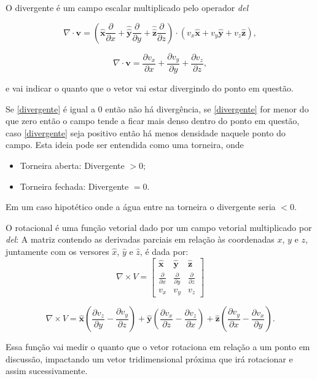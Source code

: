 O divergente é um campo escalar multiplicado pelo operador \textit{del} 

\begin{equation*}
    \nabla \cdot \textbf{v} = (\hat{\textbf{x}} \frac{\partial}{\partial x} + \hat{\hat{\textbf{y}}} \frac{\partial}{\partial y} + \hat{\hat{\textbf{z}}} \frac{\partial}{\partial z}) \cdot (v_{x} {\hat{\textbf{x}}} + v_{y} {\hat{\textbf{y}}} + v_{z} {\hat{\textbf{z}}}) ,
\end{equation*}


\begin{equation} \label{divergente}
    \nabla \cdot \textbf{v} = \frac{\partial v_{x}}{\partial x} + \frac{\partial v_{y}}{\partial y} + \frac{\partial v_{z}}{\partial z} ,
\end{equation}

e vai indicar o quanto que o vetor vai estar divergindo do ponto em questão. 

Se \ref{divergente} é igual a $0$ então não há divergência,  se \ref{divergente} for menor do que zero então o campo tende a ficar mais denso dentro do ponto em questão, caso \ref{divergente} seja positivo então há menos densidade naquele ponto do campo. Esta ideia pode ser entendida como uma torneira, onde

\begin{itemize}
    \item Torneira aberta: Divergente $ > 0$;
    \item Torneira fechada: Divergente $= 0$.
\end{itemize}

Em um caso hipotético onde a água entre na torneira o divergente seria $< 0$. 

O rotacional é uma função vetorial dado por um campo vetorial multiplicado por \textit{del}: 
A matriz contendo as derivadas parciais em relação às coordenadas $x$, $y$ e $z$, juntamente com os versores $\hat{x}$, $\hat{y}$ e $\hat{z}$, é dada por:
\begin{equation*}
\nabla \times  V = 
\begin{bmatrix}
{\hat{\textbf{x}}} & {\hat{\textbf{y}}} & {\hat{\textbf{z}}} \\
\frac{\partial}{\partial x} & \frac{\partial}{\partial y} & \frac{\partial}{\partial z} \\
v_{x} & v_{y} & v_{z}

\end{bmatrix}
\end{equation*}

\begin{equation}
    \nabla \times  V = \hat{\textbf{x}} \left(\frac{\partial v_{z}}{\partial y} - \frac{\partial v_{y}}{\partial z }\right) + \hat{\textbf{y}} \left(\frac{\partial v_x}{\partial z } - \frac{\partial v_{z}}{\partial x}\right) + \hat{\textbf{z}} \left(\frac{\partial v_{y}}{\partial x} - \frac{\partial v_{x}}{\partial y}\right) . 
\end{equation}

Essa função vai medir o quanto que o vetor rotaciona em relação a um ponto em discussão, impactando um vetor tridimensional próxima que irá rotacionar e assim sucessivamente. 
